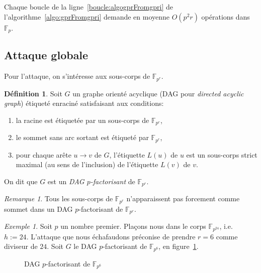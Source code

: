 \documentclass[a4paper, titlepage, 11pt]{article}
\theoremstyle{definition}
\newtheorem{defi}[theo]{Définition}
\theoremstyle{remark}
\newtheorem{rema}[theo]{Remarque}
\newtheorem{exem}[theo]{Exemple}
\def\O{O}
\def\gf #1{\mathbb{F}_{#1}}
\begin{document}
Chaque boucle de la ligne~\ref{boucle:algogprFromgpri} de l'algorithme~\ref{algo:gprFromgpri} demande en moyenne $\O(p^2r)$ opérations dans $\gf{p}$.

\subsection{Attaque globale}

Pour l'attaque, on s'intéresse aux sous-corps de $\gf{p^r}$.

\begin{defi}
Soit $G$ un graphe orienté acyclique (DAG pour \textit{directed acyclic graph}) étiqueté enraciné satisfaisant aux conditions: \begin{enumerate}
\item la racine est étiquetée par un sous-corps de $\gf{p^r}$,
\item le sommet sans arc sortant est étiqueté par $\gf{p^r}$,
\item pour chaque arête $u \rightarrow v$ de $G$, l'étiquette $L(u)$ de $u$ est un sous-corps strict maximal (au sens de l'inclusion) de l'étiquette $L(v)$ de $v$.
\end{enumerate}
On dit que $G$ est un \textit{DAG $p$-factorisant} de $\gf{p^r}$.
\end{defi}

\begin{rema}
Tous les sous-corps de $\gf{p^r}$ n'apparaissent pas forcement comme sommet dans un DAG $p$-factorisant de $\gf{p^r}$.
\end{rema}

\begin{exem}
Soit $p$ un nombre premier. Plaçons nous dans le corps $\gf{p^{24}}$, i.e. $h := 24$. L'attaque que nous échafaudons préconise de prendre $r = 6$ comme diviseur de $24$. Soit $G$ le DAG $p$-factorisant de $\gf{p^6}$, en figure~\ref{fig:dag}.
\begin{figure}[h]\caption{DAG $p$-factorisant de $\gf{p^{6}}$}
\begin{center}
\label{fig:dag}
\end{center}
\end{figure}
\end{exem}
\end{document}
